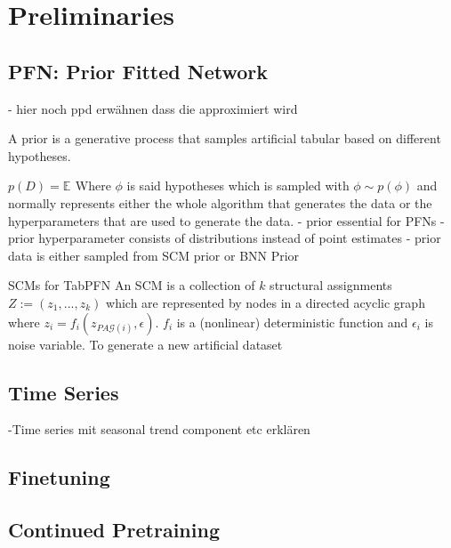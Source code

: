 \chapter{Preliminaries}
\section{PFN: Prior Fitted Network}
- hier noch ppd erwähnen dass die approximiert wird

A prior is a generative process that samples artificial tabular based on different hypotheses.

    $p(D)= \mathbb{E}_{}$
Where $\phi$ is said hypotheses which is sampled with $\phi \sim p(\phi)$ and normally represents either the whole algorithm that generates the data or the hyperparameters that are used to generate the data.
- prior essential for PFNs
- prior hyperparameter consists of distributions instead of point estimates
- prior data is either sampled from SCM prior or BNN Prior


SCMs for TabPFN
An SCM is a collection of $k$ structural assignments $Z:=(z_1, ..., z_k)$ which are represented by nodes in a directed acyclic graph where $z_i = f_i(z_{PA\mathcal{G}(i)}, \epsilon)$.
$f_i$ is a (nonlinear) deterministic function and $\epsilon_i$ is noise variable.
To generate a new artificial dataset
\section{Time Series}
-Time series mit seasonal trend component etc erklären
\section{Finetuning}
\section{Continued Pretraining}
